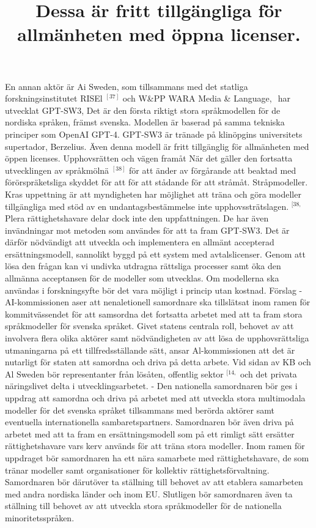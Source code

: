 {{{{{{{\title{
Dessa är fritt tillgängliga för allmänheten med öppna licenser.
}
En annan aktör är Ai Sweden, som tillsammans med det statliga forskningsinstitutet RISEl \({ }^{[37]}\) och W\&PP WARA Media \& Language, \({ }^{}\) har utvecklat GPT-SW3, Det är den första riktigt stora språkmodellen för de nordiska språken, främst svenska. Modellen är baserad på samma tekniska principer som OpenAI GPT-4. GPT-SW3 är tränade på klinöpgins universitets supertador, Berzelius. Även denna modell är fritt tillgänglig för allmänheten med öppen licenses.
Upphovsrätten och vägen framåt När det gäller den fortsatta utvecklingen av språkmölnä \(^{[38]}\) för att änder av förgårande att beaktad med förörspräketsliga skyddet för att för att stådande för att stråmåt. Stråpmodeller. Kras uppettning är att myndigheten har möjlighet att träna och göra modeller tillgängliga med stöd av en undantagsbestämmelse inte upphovssträtslagen. \({ }^{[38,}\) Plera rättighetshavare delar dock inte den uppfattningen. De har även invändningar mot metoden som användes för att ta fram GPT-SW3. Det är därför nödvändigt att utveckla och implementera en allmänt accepterad ersättningsmodell, sannolikt byggd på ett system med avtalslicenser. Genom att lösa den frågan kan vi undivka utdragna rättsliga processer samt öka den allmänna acceptansen för de modeller som utvecklas. Om modellerna ska användas i forskningsyfte bör det vara möjligt i princip utan kostnad.
Förslag
- AI-kommissionen aser att nenaletionell samordnare ska tillslätsat inom ramen för kommitvässendet för att samsordna det fortsatta arbetet med att ta fram stora språkmodeller för svenska språket. Givet statens centrala roll, behovet av att involvera flera olika aktörer samt nödvändigheten av att lösa de upphovsrättsliga utmaningarna på ett tillfredsställande sätt, ansar Al-kommissionen att det är nutarligt för staten att samordna och driva på detta arbete. Vid sidan av KB och Al Sweden bör representanter från lösåten, offentlig sektor \({ }^{[14,}\) och det privata näringslivet delta i utvecklingsarbetet.
- Den nationella samordnaren bör ges i uppdrag att samordna och driva på arbetet med att utveckla stora multimodala modeller för det svenska språket tillsammans med berörda aktörer samt eventuella internationella sambaretspartners. Samordnaren bör även driva på arbetet med att ta fram en ersättningsmodell som på ett rimligt sätt ersätter rättighetshavare vars kerv används för att träna stora modeller. Inom ramen för uppdraget bör samordnaren ha ett nära samarbete med rättighetshavare, de som tränar modeller samt organisationer för kollektiv rättighetsförvaltning. Samordnaren bör därutöver ta ställning till behovet av att etablera samarbeten med andra nordiska länder och inom EU. Slutligen bör samordnaren även ta ställning till behovet av att utveckla stora språkmodeller för de nationella minoritetsspråken.

}}}}}}}
